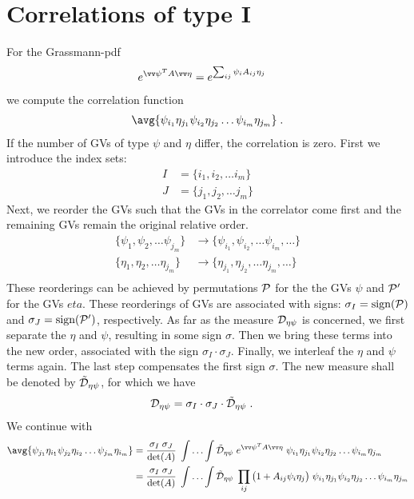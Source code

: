 \section{Correlations of type I}




For the Grassmann-pdf
%
\begin{align*}
e^{\vv \psi^{T} A \vv \eta} &=e^{\sum_{ij} \psi_{i} A_{ij}\eta_{j}}
\end{align*}
%
we compute the correlation function 
%
\begin{align*}
\avg{\psi_{i_{1}}\eta_{j_{1}}\psi_{i_{2}}\eta_{j_{2}}\ldots \psi_{i_{m}}\eta_{j_{m}}}\;.
\end{align*}
%
If the number of GVs of type $\psi$ and $\eta$ differ, the correlation is zero.
%
First we  introduce the index sets: 
%
\begin{align*}
I &=\{i_{1},i_{2},\ldots i_{m}\}\\
J &=\{j_{1},j_{2},\ldots j_{m}\}
\end{align*}
%
Next, we reorder the GVs such that the GVs in the correlator come first 
and the remaining GVs remain the original relative order.
%
\begin{align*}
\{\psi_{1}, \psi_{2}, \ldots \psi_{j_{m}}\}
&\longrightarrow 
\{\psi_{i_{1}}, \psi_{i_{2}}, \ldots \psi_{i_{m}},\ldots\}\\
\{\eta_{1}, \eta_{2}, \ldots \eta_{j_{m}}\}
&\longrightarrow 
\{\eta_{j_{1}}, \eta_{j_{2}}, \ldots \eta_{j_{m}},\ldots\}\\
\end{align*}
%
These reorderings can be achieved by permutations ${\cal P}$ for the the GVs $\psi$
and ${\cal P}'$ for the GVs $eta$. 
These reorderings of GVs are associated with  signs: $\sigma_{I}=\text{sign}({\cal P})$
and $\sigma_{J}=\text{sign}({\cal P}')$, respectively.
As far as the measure ${\cal D}_{\eta \psi}$ is concerned, we first separate the $\eta$
and $\psi$, resulting in some sign $\sigma$. Then we bring these terms into the new order, associated with the sign $\sigma_{I}\cdot \sigma_{J}$. Finally, we interleaf the $\eta$ and $\psi$ terms again. The last step
compensates the first sign $\sigma$. The new measure shall be denoted by 
$\tilde {\cal D}_{\eta \psi}$, for which we have
%
\begin{align*}
{\cal D}_{\eta \psi} &= \sigma_{I}\cdot \sigma_{J}\cdot\tilde {\cal D}_{\eta \psi}\;.
\end{align*}
%
We continue with 
%
\begin{align*}
\avg{\psi_{j_{1}}\eta_{i_{1}}\psi_{j_{2}}\eta_{i_{2}}\ldots \psi_{j_{m}}\eta_{i_{m}}}
&=\frac{\sigma_{I}\; \sigma_{J}}{\det(A)}\;\Int \Dept  \; e^{\vv \psi^{T} A \vv \eta}\;
\psi_{i_{1}}\eta_{j_{1}}\psi_{i_{2}}\eta_{j_{2}}\ldots \psi_{i_{m}}\eta_{j_{m}}\\
&=\frac{\sigma_{I}\; \sigma_{J}}{\det(A)}\;\Int \Dept  \;\prod_{ij}\big( 1 + A_{ij} \psi_{i} \eta_{j}\big) \;
\psi_{i_{1}}\eta_{j_{1}}\psi_{i_{2}}\eta_{j_{2}}\ldots \psi_{i_{m}}\eta_{j_{m}}
\end{align*}
